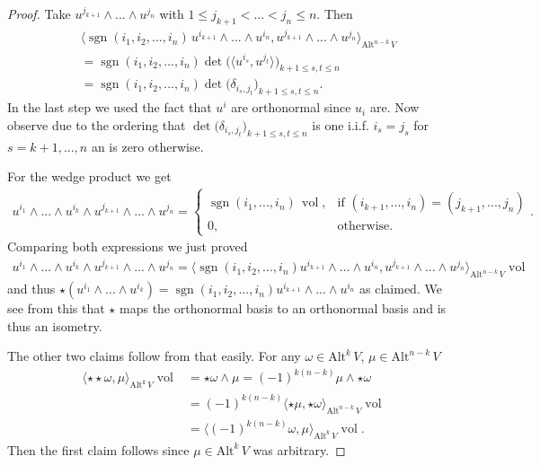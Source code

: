 \documentclass[12pt,a4paper]{article}
\numberwithin{equation}{subsection}
\numberwithin{lemma}{subsection}
\theoremstyle{definition}
\DeclareMathOperator{\sgn}{sgn}
\DeclareMathOperator{\vol}{vol}
\newcommand{\alternating}[2]{ {\text{Alt}^{#1}\,#2} }
\begin{document}
\begin{proof}
    Take $u^{j_{k+1}} \wedge ... \wedge u^{j_n}$ with 
    $1 \leq j_{k+1} < ... < j_n \leq n$. Then 
    \begin{align*}
        &\langle \sgn(i_1,i_2,...,i_n) \, u^{i_{k+1}} \wedge ... \wedge u^{i_{n}},
            u^{j_{k+1}} \wedge ... \wedge u^{j_{n}} \rangle_{\alternating{n-k}{V}}
        \\ &= \sgn(i_1,i_2,...,i_n) \det \big( \langle u^{i_s}, u^{j_t} \rangle \big)_{k+1 \leq s,t \leq n}
        \\ &= \sgn(i_1,i_2,...,i_n) \det \big( \delta_{i_s,j_t} \big)_{k+1 \leq s,t \leq n}.
    \end{align*}
    In the last step we used the fact that $u^i$ are orthonormal since $u_i$ 
    are. Now observe due to the ordering that 
    $\det \big( \delta_{i_s,j_t} \big)_{k+1 \leq s,t \leq n}$ is one i.i.f.
    $i_s = j_s$ for $s = k+1,...,n$ an is zero otherwise.

    For the wedge product we get
    \begin{align*}
        u^{i_1} \wedge ... \wedge u^{i_{k}} \wedge u^{j_{k+1}} \wedge ... 
            \wedge u^{j_n}
        =   \begin{cases}
                \sgn(i_1, ..., i_n)\, \vol, & \text{if $(i_{k+1},...,i_n) = (j_{k+1},...,j_n)$} \\
                0,  & \text{otherwise.}
            \end{cases}.
    \end{align*}
    Comparing both expressions we just proved
    \begin{align*}
        u^{i_1} \wedge ... \wedge u^{i_{k}} \wedge u^{j_{k+1}} \wedge ... \wedge u^{j_n}
        = \langle \sgn(i_1,i_2,...,i_n) u^{i_{k+1}} \wedge ... \wedge u^{i_{n}},
            u^{j_{k+1}} \wedge ... \wedge u^{j_{n}} \rangle_{\alternating{n-k}{V}} \vol
    \end{align*}
    and thus  
    $\star (u^{i_1} \wedge ... \wedge u^{i_{k}}) = 
    \sgn(i_1,i_2,...,i_n) u^{i_{k+1}} \wedge ... \wedge u^{i_{n}}$ as claimed.
    We see from this that $\star$ maps the orthonormal basis to an orthonormal
    basis and is thus an isometry.

    The other two claims follow from that easily. For any $\omega \in 
    \alternating{k}{V}$, $\mu \in \alternating{n-k}{V}$
    \begin{align*}
        \langle \star \star \omega , \mu \rangle_{\alternating{k}{V}}\vol
        &= \star \omega \wedge \mu
        = (-1)^{k(n-k)} \mu \wedge \star \omega 
        \\ &= (-1)^{k(n-k)} \langle \star \mu , \star \omega \rangle_{\alternating{n-k}{V}} \vol
        \\ &= \langle (-1)^{k(n-k)} \omega , \mu \rangle_{\alternating{k}{V}} \vol.
    \end{align*}
    Then the first claim follows since $\mu \in \alternating{k}{V}$ was
    arbitrary.


\end{proof}
\end{document}
